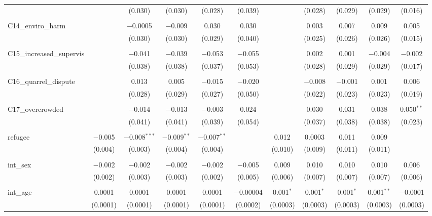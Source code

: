 \begin{table}[H]
\begin{tabular}{@{\extracolsep{4pt}}lcccccccccc}
  &  & (0.030) & (0.030) & (0.028) & (0.039) &  & (0.028) & (0.029) & (0.029) & (0.016) \\ 
  & & & & & & & & & & \\ 
 C14\_enviro\_harm &  & $-$0.0005 & $-$0.009 & 0.030 & 0.030 &  & 0.003 & 0.007 & 0.009 & 0.005 \\ 
  &  & (0.030) & (0.030) & (0.029) & (0.040) &  & (0.025) & (0.026) & (0.026) & (0.015) \\ 
  & & & & & & & & & & \\ 
 C15\_increased\_supervis &  & $-$0.041 & $-$0.039 & $-$0.053 & $-$0.055 &  & 0.002 & 0.001 & $-$0.004 & $-$0.002 \\ 
  &  & (0.038) & (0.038) & (0.037) & (0.053) &  & (0.028) & (0.029) & (0.029) & (0.017) \\ 
  & & & & & & & & & & \\ 
 C16\_quarrel\_dispute &  & 0.013 & 0.005 & $-$0.015 & $-$0.020 &  & $-$0.008 & $-$0.001 & 0.001 & 0.006 \\ 
  &  & (0.028) & (0.029) & (0.027) & (0.050) &  & (0.022) & (0.023) & (0.023) & (0.019) \\ 
  & & & & & & & & & & \\ 
 C17\_overcrowded &  & $-$0.014 & $-$0.013 & $-$0.003 & 0.024 &  & 0.030 & 0.031 & 0.038 & 0.050$^{**}$ \\ 
  &  & (0.041) & (0.041) & (0.039) & (0.054) &  & (0.037) & (0.038) & (0.038) & (0.023) \\ 
  & & & & & & & & & & \\ 
 refugee & $-$0.005 & $-$0.008$^{***}$ & $-$0.009$^{**}$ & $-$0.007$^{**}$ &  & 0.012 & 0.0003 & 0.011 & 0.009 &  \\ 
  & (0.004) & (0.003) & (0.004) & (0.004) &  & (0.010) & (0.009) & (0.011) & (0.011) &  \\ 
  & & & & & & & & & & \\ 
 int\_sex & $-$0.002 & $-$0.002 & $-$0.002 & $-$0.002 & $-$0.005 & 0.009 & 0.010 & 0.010 & 0.010 & 0.006 \\ 
  & (0.002) & (0.003) & (0.003) & (0.002) & (0.005) & (0.006) & (0.007) & (0.007) & (0.007) & (0.006) \\ 
  & & & & & & & & & & \\ 
 int\_age & 0.0001 & 0.0001 & 0.0001 & 0.0001 & $-$0.00004 & 0.001$^{*}$ & 0.001$^{*}$ & 0.001$^{*}$ & 0.001$^{**}$ & $-$0.0001 \\ 
  & (0.0001) & (0.0001) & (0.0001) & (0.0001) & (0.0002) & (0.0003) & (0.0003) & (0.0003) & (0.0003) & (0.0003) \\ 

\end{tabular}
\end{table}
